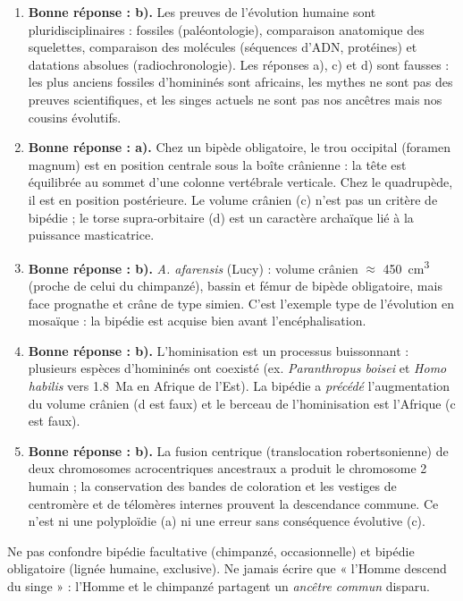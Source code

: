 \documentclass[11pt]{article}
\newcommand{\cle}[1]{{\popxbold\color{popdark}#1}}
\begin{document}
\begin{corrige}
\begin{enumerate}
    \item \textbf{Bonne réponse : b).} Les preuves de l'évolution humaine sont pluridisciplinaires : fossiles (paléontologie), comparaison anatomique des squelettes, comparaison des molécules (séquences d'ADN, protéines) et datations absolues (radiochronologie). Les réponses a), c) et d) sont fausses : les plus anciens fossiles d'homininés sont africains, les mythes ne sont pas des preuves scientifiques, et les singes actuels ne sont pas nos ancêtres mais nos cousins évolutifs.
    \item \textbf{Bonne réponse : a).} Chez un bipède obligatoire, le trou occipital (foramen magnum) est en position centrale sous la boîte crânienne : la tête est équilibrée au sommet d'une colonne vertébrale verticale. Chez le quadrupède, il est en position postérieure. Le volume crânien (c) n'est pas un critère de bipédie ; le torse supra-orbitaire (d) est un caractère archaïque lié à la puissance masticatrice.
    \item \textbf{Bonne réponse : b).} \emph{A. afarensis} (Lucy) : volume crânien $\approx$ \SI{450}{cm^3} (proche de celui du chimpanzé), bassin et fémur de bipède obligatoire, mais face prognathe et crâne de type simien. C'est l'exemple type de l'évolution en \cle{mosaïque} : la bipédie est acquise bien avant l'encéphalisation.
    \item \textbf{Bonne réponse : b).} L'hominisation est un processus \cle{buissonnant} : plusieurs espèces d'homininés ont coexisté (ex. \emph{Paranthropus boisei} et \emph{Homo habilis} vers \SI{1,8}{Ma} en Afrique de l'Est). La bipédie a \emph{précédé} l'augmentation du volume crânien (d est faux) et le berceau de l'hominisation est l'Afrique (c est faux).
    \item \textbf{Bonne réponse : b).} La fusion centrique (translocation robertsonienne) de deux chromosomes acrocentriques ancestraux a produit le chromosome 2 humain ; la conservation des bandes de coloration et les vestiges de centromère et de télomères internes prouvent la descendance commune. Ce n'est ni une polyploïdie (a) ni une erreur sans conséquence évolutive (c).
\end{enumerate}
\end{corrige}

\begin{attention}
Ne pas confondre \cle{bipédie facultative} (chimpanzé, occasionnelle) et \cle{bipédie obligatoire} (lignée humaine, exclusive). Ne jamais écrire que « l'Homme descend du singe » : l'Homme et le chimpanzé partagent un \emph{ancêtre commun} disparu.
\end{attention}
\end{document}
